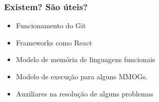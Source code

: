 \begin{frame}
    \frametitle{Existem? São úteis?}

    \begin{itemize}
        \item Funcionamento do Git
        \item Frameworks como React
        \item Modelo de memória de linguagens funcionais
        \item Modelo de execução para alguns MMOGs.
        \item Auxiliares na resolução de alguns problemas
    \end{itemize}
\end{frame}